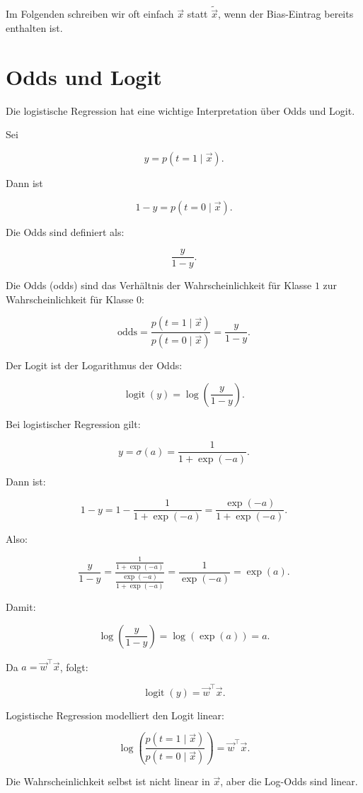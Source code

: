 Im Folgenden schreiben wir oft einfach \(\vec{x}\) statt \(\tilde{\vec{x}}\), wenn der Bias-Eintrag bereits enthalten ist.

\section{Odds und Logit}

Die logistische Regression hat eine wichtige Interpretation über Odds und Logit.

Sei

\[
    y
    =
    p(t=1\mid\vec{x}).
\]

Dann ist

\[
    1-y
    =
    p(t=0\mid\vec{x}).
\]

Die Odds sind definiert als:

\[
    \frac{y}{1-y}.
\]

\begin{definitionbox}
Die Odds (odds) sind das Verhältnis der Wahrscheinlichkeit für Klasse \(1\) zur Wahrscheinlichkeit für Klasse \(0\):

\[
    \mathrm{odds}
    =
    \frac{p(t=1\mid\vec{x})}{p(t=0\mid\vec{x})}
    =
    \frac{y}{1-y}.
\]
\end{definitionbox}

Der Logit ist der Logarithmus der Odds:

\[
    \operatorname{logit}(y)
    =
    \log
    \left(
        \frac{y}{1-y}
    \right).
\]

Bei logistischer Regression gilt:

\[
    y
    =
    \sigma(a)
    =
    \frac{1}{1+\exp(-a)}.
\]

Dann ist:

\[
    1-y
    =
    1-
    \frac{1}{1+\exp(-a)}
    =
    \frac{\exp(-a)}{1+\exp(-a)}.
\]

Also:

\[
    \frac{y}{1-y}
    =
    \frac{
        \frac{1}{1+\exp(-a)}
    }{
        \frac{\exp(-a)}{1+\exp(-a)}
    }
    =
    \frac{1}{\exp(-a)}
    =
    \exp(a).
\]

Damit:

\[
    \log
    \left(
        \frac{y}{1-y}
    \right)
    =
    \log(\exp(a))
    =
    a.
\]

Da \(a=\vec{w}^{\top}\vec{x}\), folgt:

\[
    \operatorname{logit}(y)
    =
    \vec{w}^{\top}\vec{x}.
\]

\begin{conceptbox}
Logistische Regression modelliert den Logit linear:

\[
    \log
    \left(
        \frac{p(t=1\mid\vec{x})}{p(t=0\mid\vec{x})}
    \right)
    =
    \vec{w}^{\top}\vec{x}.
\]

Die Wahrscheinlichkeit selbst ist nicht linear in \(\vec{x}\), aber die Log-Odds sind linear.
\end{conceptbox}

